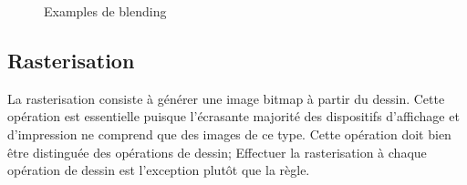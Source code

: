 				\begin{figure}[h]
					\centering
					\caption{Examples de blending}
					\label{fig:blending}
				\end{figure}
		\subsection{Rasterisation}
			La rasterisation consiste à générer une image bitmap à partir du dessin. Cette opération est essentielle puisque l'écrasante
			majorité des dispositifs d'affichage et d'impression ne comprend que des images de ce type. Cette opération doit bien être
			distinguée des opérations de dessin; Effectuer la rasterisation à chaque opération de dessin est l'exception plutôt que la règle.
				
